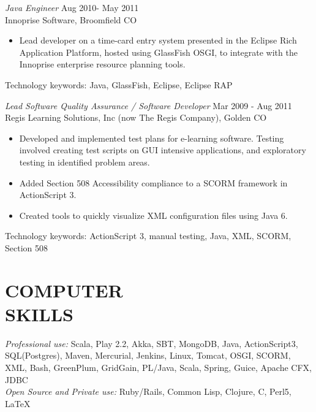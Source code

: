 \documentclass[line,margin]{res}
\begin{document}
\begin{resume}
 
                {\sl Java Engineer} \hfill          Aug 2010- May 2011 \\
                Innoprise Software, Broomfield CO
                 \begin{itemize}  \itemsep -2pt %
                 \item Lead developer on a time-card entry system presented in the Eclipse Rich Application Platform, hosted using GlassFish OSGI, to integrate with the
		Innoprise enterprise resource planning tools.
\end{itemize} 
	     Technology keywords: Java, GlassFish, Eclipse, Eclipse RAP
                

                {\sl Lead Software Quality Assurance / Software Developer} \hfill        Mar 2009 - Aug 2011 \\
                Regis Learning Solutions, Inc (now The Regis Company), Golden CO
                  \begin{itemize}  \itemsep -2pt %
                   \item Developed and implemented test plans for e-learning software. Testing involved creating test scripts on GUI intensive applications, and exploratory testing in identified problem areas.
		\item Added Section 508 Accessibility compliance to a SCORM framework in ActionScript 3.
		\item Created tools to quickly visualize XML configuration files using Java 6.   
    \end{itemize} 
		Technology keywords: ActionScript 3, manual testing, Java, XML, SCORM, Section 508
            
 \section{COMPUTER \\ SKILLS} {\sl Professional use:} Scala, Play 2.2, Akka, SBT, MongoDB, Java, ActionScript3, SQL(Postgres), Maven, Mercurial, Jenkins, Linux, Tomcat, OSGI, SCORM, XML, Bash, GreenPlum, GridGain, PL/Java, Scala, Spring, Guice, Apache CFX, JDBC  \\
                {\sl Open Source and Private use:} Ruby/Rails, Common Lisp, Clojure, C, Perl5, \LaTeX \\



\end{resume}
\end{document}

